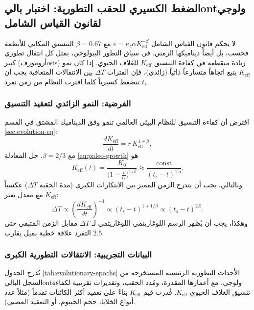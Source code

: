 \documentclass[11pt,a4paper]{article}
\begin{document}
	\subsection{الضغط الكسيري للحقب التطورية: اختبار باليontولوجي لقانون القياس الشامل}
	\label{subsec:paleo-scaling}
	
	لا يحكم قانون القياس الشامل \(\varepsilon = \kappa_c \alpha K_{\mathrm{eff}}^{-\beta}\) مع \(\beta = 0.67\) التنسيق المكاني للأنظمة فحسب، بل أيضاً ديناميكها الزمني. في سياق التطور البيولوجي، يمثل كل انتقال تطوري كبير (أرومورفosis) زيادة متقطعة في كفاءة التنسيق \(K_{\mathrm{eff}}\) للغلاف الحيوي. إذا كان نمو \(K_{\mathrm{eff}}\) يتبع اتجاهاً متسارعاً ذاتياً (زائدي)، فإن الفترات \(\Delta T\) بين الانتقالات المتعاقبة يجب أن تنضغط كسيرياً كلما اقترب النظام من زمن تفرد \(t_s\).
	
	\subsubsection{الفرضية: النمو الزائدي لتعقيد التنسيق}
	
	افترض أن كفاءة التنسيق للنظام البيئي العالمي تنمو وفق الديناميك المشتق في القسم \ref{sec:evolution-eq}:
	\begin{equation}
		\frac{dK_{\mathrm{eff}}}{dt} = r \, K_{\mathrm{eff}}^{1+\beta},
		\label{eq:paleo-growth}
	\end{equation}
	مع \(\beta = 2/3\). حل المعادلة \eqref{eq:paleo-growth} هو
	\begin{equation}
		K_{\mathrm{eff}}(t) = \frac{K_0}{\bigl(1 - \frac{t}{t_s}\bigr)^{1/\beta}} \approx \frac{\text{const}}{(t_s - t)^{1.5}}.
		\label{eq:paleo-keff}
	\end{equation}
	وبالتالي، يجب أن يتدرج الزمن المميز بين الابتكارات الكبرى (مدة الحقبة \(\Delta T\)) عكسياً مع معدل تغير \(K_{\mathrm{eff}}\):
	\begin{equation}
		\Delta T \propto \left( \frac{dK_{\mathrm{eff}}}{dt} \right)^{-1} \propto (t_s - t)^{1 + 1/\beta} \propto (t_s - t)^{2.5}.
		\label{eq:paleo-dT}
	\end{equation}
	وهكذا، يجب أن يُظهر الرسم اللوغاريتمي-اللوغاريتمي لـ \(\Delta T\) مقابل الزمن المتبقي حتى التفرد علاقة خطية بميل يقارب \(2.5\).
	
	\subsubsection{البيانات التجريبية: الانتقالات التطورية الكبرى}
	
	يُدرج الجدول \ref{tab:evolutionary-epochs} الأحداث التطورية الرئيسية المستخرجة من السجل الباليontولوجي، مع أعمارها المقدرة، ومُدد الحقب، وتقديرات تقريبية لكفاءة تنسيق الغلاف الحيوي \(K_{\mathrm{eff}}\). قُدرت قيم \(K_{\mathrm{eff}}\) بناءً على تعقيد أكثر الكائنات تقدماً (مثلاً عدد أنواع الخلايا، حجم الجينوم، أو التعقيد العصبي).
	
\end{document}
